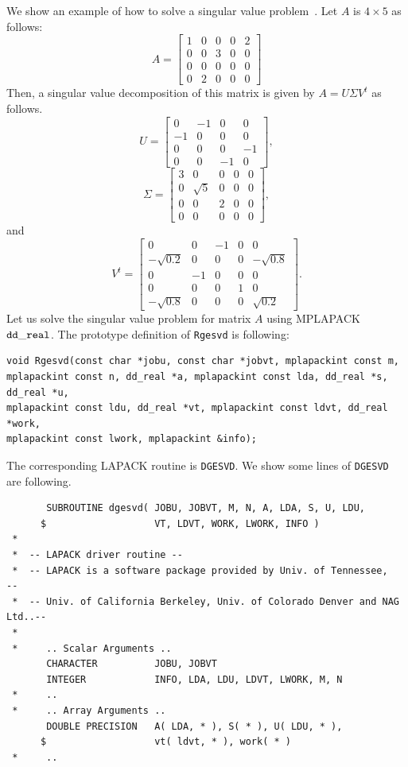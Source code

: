 \documentclass[12pt]{article}
\begin{document}
We show an example of how to solve a singular value problem~\cite{wikipedia_svd}.
Let $A$ is $4 \times 5$ as follows:
\[
A=\left[\begin{array}{lllll}1 & 0 & 0 & 0 & 2 \\ 0 & 0 & 3 & 0 & 0 \\ 0 & 0 & 0 & 0 & 0 \\ 0 & 2 & 0 & 0 & 0\end{array}\right]
\]
Then, a singular value decomposition of this matrix is given by $A= U\Sigma V^t$ as follows.
\[
{U}=\left[\begin{array}{cccc}0 & -1 & 0 & 0 \\ -1 & 0 & 0 & 0 \\ 0 & 0 & 0 & -1 \\ 0 & 0 & -1 & 0\end{array}\right],
\]
\[
\Sigma=\left[\begin{array}{ccccc}3 & 0 & 0 & 0 & 0 \\ 0 & \sqrt{5} & 0 & 0 & 0 \\ 0 & 0 & 2 & 0 & 0 \\ 0 & 0 & 0 & 0 & 0\end{array}\right],
\]
and
\[
V^t=\left[\begin{array}{ccccc}0 & 0 & -1 & 0 & 0 \\ -\sqrt{0.2} & 0 & 0 & 0 & -\sqrt{0.8} \\ 0 & -1 & 0 & 0 & 0 \\ 0 & 0 & 0 & 1 & 0 \\ -\sqrt{0.8} & 0 & 0 & 0 & \sqrt{0.2}\end{array}\right].
\]
Let us solve the singular value problem for matrix $A$ using MPLAPACK $\tt dd\_real$.
The prototype definition of {\tt Rgesvd} is following:
\begin{verbatim}
void Rgesvd(const char *jobu, const char *jobvt, mplapackint const m,
mplapackint const n, dd_real *a, mplapackint const lda, dd_real *s, dd_real *u,
mplapackint const ldu, dd_real *vt, mplapackint const ldvt, dd_real *work,
mplapackint const lwork, mplapackint &info);
\end{verbatim}
The corresponding LAPACK routine is {\tt DGESVD}. We show some lines of {\tt DGESVD} are following.
\begin{verbatim}
       SUBROUTINE dgesvd( JOBU, JOBVT, M, N, A, LDA, S, U, LDU,
      $                   VT, LDVT, WORK, LWORK, INFO )
 *
 *  -- LAPACK driver routine --
 *  -- LAPACK is a software package provided by Univ. of Tennessee,    --
 *  -- Univ. of California Berkeley, Univ. of Colorado Denver and NAG Ltd..--
 *
 *     .. Scalar Arguments ..
       CHARACTER          JOBU, JOBVT
       INTEGER            INFO, LDA, LDU, LDVT, LWORK, M, N
 *     ..
 *     .. Array Arguments ..
       DOUBLE PRECISION   A( LDA, * ), S( * ), U( LDU, * ),
      $                   vt( ldvt, * ), work( * )
 *     ..
\end{verbatim}
\end{document}
